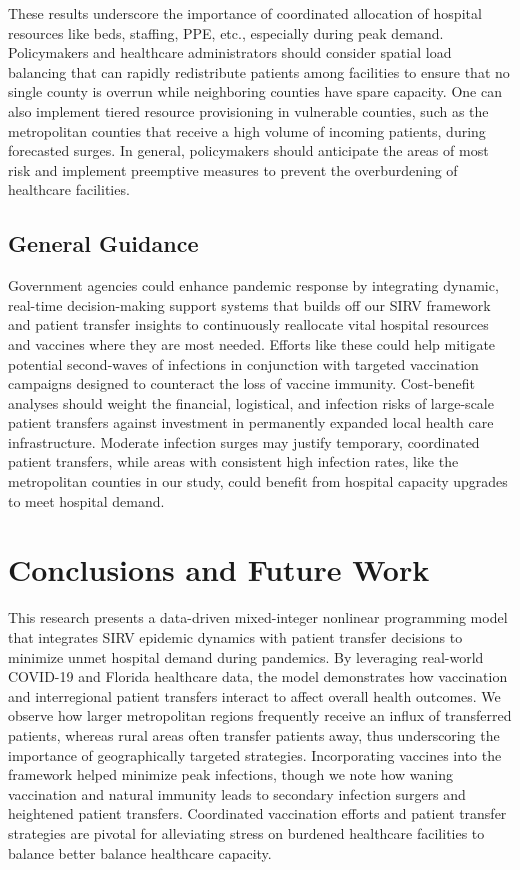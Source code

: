 \documentclass{article}
\begin{document}
{These results underscore the importance of coordinated allocation of hospital resources like beds, staffing, PPE, etc., especially during peak demand. Policymakers and healthcare administrators should consider spatial load balancing that can rapidly redistribute patients among facilities to ensure that no single county is overrun while neighboring counties have spare capacity. One can also implement tiered resource provisioning in vulnerable counties, such as the metropolitan counties that receive a high volume of incoming patients, during forecasted surges. In general, policymakers should anticipate the areas of most risk and implement preemptive measures to prevent the overburdening of healthcare facilities.

\subsection{General Guidance}
Government agencies could enhance pandemic response by integrating dynamic, real-time decision-making support systems that builds off our SIRV framework and patient transfer insights to continuously reallocate vital hospital resources and vaccines where they are most needed. Efforts like these could help mitigate potential second-waves of infections in conjunction with targeted vaccination campaigns designed to counteract the loss of vaccine immunity. Cost-benefit analyses should weight the financial, logistical, and infection risks of large-scale patient transfers against investment in permanently expanded local health care infrastructure. Moderate infection surges may justify temporary, coordinated patient transfers, while areas with consistent high infection rates, like the metropolitan counties in our study, could benefit from hospital capacity upgrades to meet hospital demand. 

}

\section{Conclusions and Future Work}
This research presents a data-driven mixed-integer nonlinear programming model that integrates SIRV epidemic dynamics with patient transfer decisions to minimize unmet hospital demand during pandemics. By leveraging real-world COVID-19 and Florida healthcare data, the model demonstrates how vaccination and interregional patient transfers interact to affect overall health outcomes. We observe how larger metropolitan regions frequently receive an influx of transferred patients, whereas rural areas often transfer patients away, thus underscoring the importance of geographically targeted strategies. Incorporating vaccines into the framework helped minimize peak infections, though we note how waning vaccination and natural immunity leads to secondary infection surgers and heightened patient transfers. Coordinated vaccination efforts and patient transfer strategies are pivotal for alleviating stress on burdened healthcare facilities to balance better balance healthcare capacity. 
\end{document}
